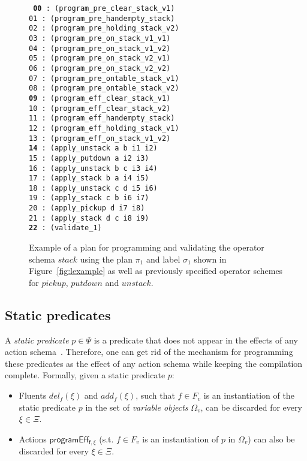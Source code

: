 \documentclass[letterpaper]{article} %
\begin{document}
\begin{figure}
{\tt\small
     {\bf 00} : (program\_pre\_clear\_stack\_v1)\\
     01 : (program\_pre\_handempty\_stack)\\
     02 : (program\_pre\_holding\_stack\_v2)\\
     03 : (program\_pre\_on\_stack\_v1\_v1)\\
     04 : (program\_pre\_on\_stack\_v1\_v2)\\
     05 : (program\_pre\_on\_stack\_v2\_v1)\\
     06 : (program\_pre\_on\_stack\_v2\_v2)\\
     07 : (program\_pre\_ontable\_stack\_v1)\\
     08 : (program\_pre\_ontable\_stack\_v2)\\
     {\bf 09} : (program\_eff\_clear\_stack\_v1)\\
    10 : (program\_eff\_clear\_stack\_v2)\\
    11 : (program\_eff\_handempty\_stack)\\
    12 : (program\_eff\_holding\_stack\_v1)\\
    13 : (program\_eff\_on\_stack\_v1\_v2)\\
    {\bf 14} : (apply\_unstack a b i1 i2)\\
    15 : (apply\_putdown a i2 i3)\\
    16 : (apply\_unstack b c i3 i4)\\
    17 : (apply\_stack b a i4 i5)\\
    18 : (apply\_unstack c d i5 i6)\\
    19 : (apply\_stack c b i6 i7)\\
    20 : (apply\_pickup d i7 i8)\\
    21 : (apply\_stack d c i8 i9)\\
    {\bf 22} : (validate\_1)
}
 \caption{\small Example of a plan for programming and validating the operator schema $stack$ using the plan $\pi_1$ and label $\sigma_1$ shown in Figure~\ref{fig:lexample} as well as previously specified operator schemes for $pickup$, $putdown$ and $unstack$.}
\label{fig:plan}
\end{figure}

\subsection{Static predicates}
A {\em static predicate} $p \in \Psi$ is a predicate that does not appear in the effects of any action schema~\cite{fox:TIM:JAIR1998}. Therefore, one can get rid of the mechanism for programming these predicates as the effect of any action schema while keeping the compilation complete. Formally, given a static predicate $p$:
\begin{itemize}
\item Fluents $del_f(\xi)$ and $add_f(\xi)$, such that $f\in F_v$ is an instantiation of the static predicate $p$ in the set of {\em variable objects} $\Omega_v$, can be discarded for every $\xi\in\Xi$.
\item Actions $\mathsf{programEff_{f,\xi}}$ (s.t. $f\in F_v$ is an instantiation of $p$ in $\Omega_v$) can also be discarded for every $\xi\in\Xi$.
\end{itemize}
\end{document}
